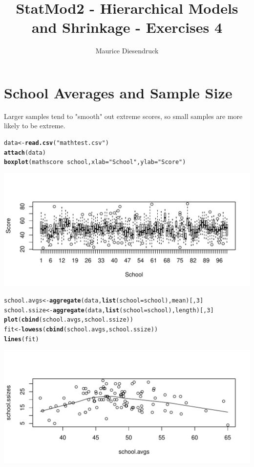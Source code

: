 \documentclass[12pt,letterpaper]{article}\usepackage[]{graphicx}\usepackage[]{color}
\author{Maurice Diesendruck\vspace{-2ex}}
\title{StatMod2 - Hierarchical Models and Shrinkage - Exercises 4\vspace{-1ex}}
\makeatletter
\def\maxwidth{ %
  \ifdim\Gin@nat@width>\linewidth
    \linewidth
  \else
    \Gin@nat@width
  \fi
}
\newcommand{\hlnum}[1]{\textcolor[rgb]{0.686,0.059,0.569}{#1}}%
\newcommand{\hlstr}[1]{\textcolor[rgb]{0.192,0.494,0.8}{#1}}%
\newcommand{\hlopt}[1]{\textcolor[rgb]{0,0,0}{#1}}%
\newcommand{\hlstd}[1]{\textcolor[rgb]{0.345,0.345,0.345}{#1}}%
\newcommand{\hlkwb}[1]{\textcolor[rgb]{0.69,0.353,0.396}{#1}}%
\newcommand{\hlkwc}[1]{\textcolor[rgb]{0.333,0.667,0.333}{#1}}%
\newcommand{\hlkwd}[1]{\textcolor[rgb]{0.737,0.353,0.396}{\textbf{#1}}}%
\newenvironment{kframe}{%
 \def\at@end@of@kframe{}%
 \ifinner\ifhmode%
  \def\at@end@of@kframe{\end{minipage}}%
  \begin{minipage}{\columnwidth}%
 \fi\fi%
 \def\FrameCommand##1{\hskip\@totalleftmargin \hskip-\fboxsep
 \colorbox{shadecolor}{##1}\hskip-\fboxsep
     \hskip-\linewidth \hskip-\@totalleftmargin \hskip\columnwidth}%
 \MakeFramed {\advance\hsize-\width
   \@totalleftmargin\z@ \linewidth\hsize
   \@setminipage}}%
 {\par\unskip\endMakeFramed%
 \at@end@of@kframe}
\newenvironment{knitrout}{}{} %
\makeatother
\begin{document}
\maketitle

\section{School Averages and Sample Size}

Larger samples tend to "smooth" out extreme scores, so small samples are more 
likely to be extreme.\\

\begin{knitrout}
\color{fgcolor}\begin{kframe}
\begin{alltt}
\hlstd{data} \hlkwb{<-} \hlkwd{read.csv}\hlstd{(}\hlstr{"mathtest.csv"}\hlstd{)}
\hlkwd{attach}\hlstd{(data)}
\hlkwd{boxplot}\hlstd{(mathscore} \hlopt{~} \hlstd{school,} \hlkwc{xlab}\hlstd{=}\hlstr{"School"}\hlstd{,} \hlkwc{ylab}\hlstd{=}\hlstr{"Score"}\hlstd{)}
\end{alltt}
\end{kframe}
\includegraphics[width=\maxwidth]{figure/unnamed-chunk-1-1} 
\begin{kframe}\begin{alltt}
\hlstd{school.avgs} \hlkwb{<-} \hlkwd{aggregate}\hlstd{(data,} \hlkwd{list}\hlstd{(}\hlkwc{school}\hlstd{=school), mean)[,}\hlnum{3}\hlstd{]}
\hlstd{school.ssize} \hlkwb{<-} \hlkwd{aggregate}\hlstd{(data,} \hlkwd{list}\hlstd{(}\hlkwc{school}\hlstd{=school), length)[,}\hlnum{3}\hlstd{]}
\hlkwd{plot}\hlstd{(}\hlkwd{cbind}\hlstd{(school.avgs, school.ssize))}
\hlstd{fit} \hlkwb{<-} \hlkwd{lowess}\hlstd{(}\hlkwd{cbind}\hlstd{(school.avgs, school.ssize))}
\hlkwd{lines}\hlstd{(fit)}
\end{alltt}
\end{kframe}
\includegraphics[width=\maxwidth]{figure/unnamed-chunk-1-2} 

\end{knitrout}
\end{document}

